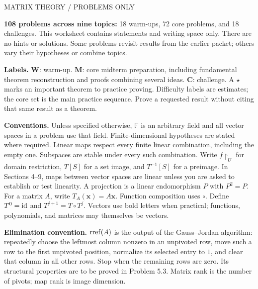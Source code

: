 \documentclass[11pt,letterpaper]{article}
\newcommand{\F}{\mathbb F}\newcommand{\R}{\mathbb R}\newcommand{\Q}{\mathbb Q}\newcommand{\C}{\mathbb C}\newcommand{\Z}{\mathbb Z}
\begin{document}
\begin{center}{\small\sffamily\color{teal} MATRIX THEORY / PROBLEMS ONLY}\par{}\par\vspace{6pt}{\large CMU 21-242: through change of basis}\end{center}
\vspace{10pt}
\textbf{108 problems across nine topics:} 18 warm-ups, 72 core problems, and 18 challenges. This worksheet contains statements and writing space only. There are no hints or solutions. Some problems revisit results from the earlier packet; others vary their hypotheses or combine topics.

\textbf{Labels.} \textbf{W}: warm-up. \textbf{M}: core midterm preparation, including fundamental theorem reconstruction and proofs combining several ideas. \textbf{C}: challenge. A $\star$ marks an important theorem to practice proving. Difficulty labels are estimates; the core set is the main practice sequence. Prove a requested result without citing that same result as a theorem.

\textbf{Conventions.} Unless specified otherwise, $\F$ is an arbitrary field and all vector spaces in a problem use that field. Finite-dimensional hypotheses are stated where required. Linear maps respect every finite linear combination, including the empty one. Subspaces are stable under every such combination. Write $f\restriction_U$ for domain restriction, $T[S]$ for a set image, and $T^{-1}[S]$ for a preimage. In Sections 4--9, maps between vector spaces are linear unless you are asked to establish or test linearity. A projection is a linear endomorphism $P$ with $P^2=P$. For a matrix $A$, write $T_A(\mathbf x)=A\mathbf x$. Function composition uses $\circ$. Define $T^0=\operatorname{id}$ and $T^{j+1}=T\circ T^j$. Vectors use bold letters when practical; functions, polynomials, and matrices may themselves be vectors.

\textbf{Elimination convention.} $\operatorname{rref}(A)$ is the output of the Gauss--Jordan algorithm: repeatedly choose the leftmost column nonzero in an unpivoted row, move such a row to the first unpivoted position, normalize its selected entry to $1$, and clear that column in all other rows. Stop when the remaining rows are zero. Its structural properties are to be proved in Problem 5.3. Matrix rank is the number of pivots; map rank is image dimension.
\end{document}
